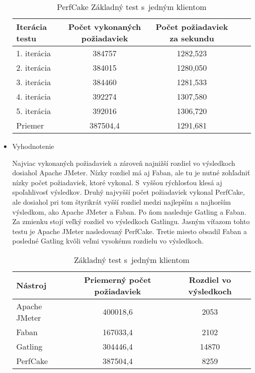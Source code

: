 \documentclass[12pt,oneside,final]{fithesis-utf8}
\begin{document}
\begin{itemize}
\begin{table}[H]
\begin{center}
\begin{tabular}{ | l | c | c | c | c |}
		\hline
		 \textbf{Iterácia testu} & \textbf{Počet vykonaných požiadaviek} & \textbf{Počet požiadaviek za sekundu} \\ \hline
		 1. iterácia & 384757 & 1282,523 \\ \hline
		 2. iterácia & 384015 & 1280,050 \\ \hline
		 3. iterácia & 384460 & 1281,533 \\ \hline
		 4. iterácia & 392274 & 1307,580 \\ \hline
		 5. iterácia & 392016 & 1306,720 \\ \hline
		 Priemer & 387504,4 & 1291,681 \\ \hline
		 
\end{tabular}
\end{center}
\caption{PerfCake Základný test s~jedným klientom}
\end{table}

\item Vyhodnotenie

Najviac vykonaných požiadaviek a zároveň najnižší rozdiel vo výsledkoch dosiahol Apache JMeter. Nízky rozdiel má aj Faban, ale  tu je nutné zohľadniť nízky počet požiadaviek, ktoré vykonal. S~vyššou rýchlosťou klesá aj spoľahlivosť výsledkov. Druhý najvyšší počet požiadaviek vykonal PerfCake, ale dosiahol pri tom štyrikrát vyšší rozdiel medzi najlepším a najhorším výsledkom, ako Apache JMeter a Faban. Po ňom nasleduje Gatling a Faban. Za zmienku stojí veľký rozdiel vo výsledkoch Gatlingu. Jasným víťazom tohto testu je Apache JMeter nasledovaný PerfCake. Tretie miesto obsadil Faban a posledné Gatling kvôli veľmi vysokému rozdielu vo výsledkoch.

\begin{table}[H]
\begin{center}
\begin{tabular}{ | l | c | c |}
		\hline
		 \textbf{Nástroj} & \textbf{Priemerný počet požiadaviek} & \textbf{Rozdiel vo výsledkoch} \\ \hline
		 Apache JMeter & 400018,6 & 2053 \\ \hline
		 Faban & 167033,4 & 2102 \\ \hline
		 Gatling & 304446,4 & 14870 \\ \hline
		 PerfCake & 387504,4 & 8259 \\ \hline
\end{tabular}
\end{center}
\caption{Základný test s~jedným klientom}
\end{table}

\end{itemize}
\end{document}
